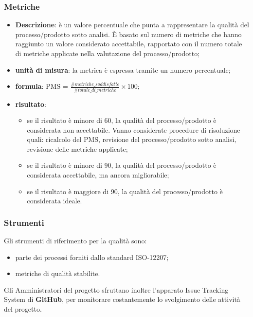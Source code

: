 	\subsubsection{Metriche}
	\begin{itemize}
		\item \textbf{Descrizione}: è un valore percentuale che punta a rappresentare la qualità del processo/prodotto sotto analisi. È basato sul numero di metriche che hanno raggiunto un valore considerato accettabile, rapportato con il numero totale di metriche applicate nella valutazione del processo/prodotto;
		\item \textbf{unità di misura}: la metrica è espressa tramite un numero percentuale;
		\item \textbf{formula}: PMS = $\displaystyle\frac{\#metriche\_soddisfatte}{\#totale\_di\_metriche}\times100$;
		\item \textbf{risultato}: 
		\begin{itemize}
			\item {se il risultato è minore di 60, la qualità del processo/prodotto è considerata non accettabile. Vanno considerate procedure di risoluzione quali:	ricalcolo del PMS, revisione del processo/prodotto sotto analisi, revisione delle metriche applicate;}
			\item {se il risultato è minore di 90, la qualità del processo/prodotto è considerata accettabile, ma ancora migliorabile;}
			\item {se il risultato è maggiore di 90, la qualità del processo/prodotto è considerata ideale.}
		\end{itemize}
	\end{itemize}	
    \subsubsection{Strumenti}
      Gli strumenti di riferimento per la qualità sono:
      \begin{itemize}
      	\item{parte dei processi forniti dallo standard ISO-12207;}
      	\item{metriche di qualità stabilite.}
      \end{itemize}
  	  Gli Amministratori del progetto sfruttano inoltre l'apparato Issue Tracking System di \textbf{\mbox{GitHub}}, per monitorare costantemente lo svolgimento delle attività del progetto.

